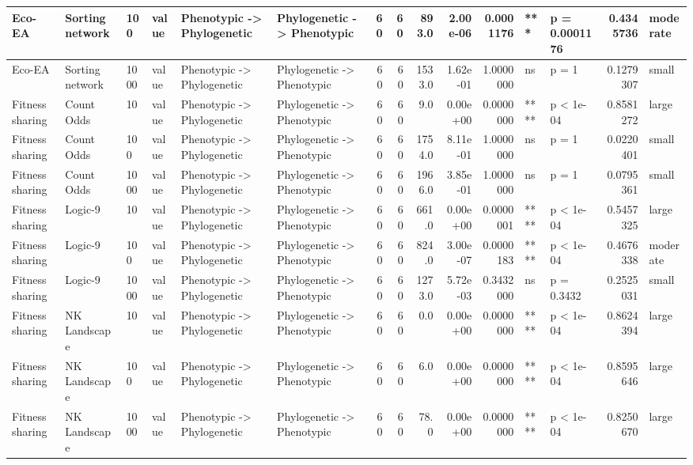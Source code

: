 \documentclass[]{book}
\begin{document}
\begin{table}
\begin{tabular}[t]{l|l|l|l|l|l|r|r|r|r|r|l|l|r|l}
\hline
Eco-EA & Sorting network & 100 & value & Phenotypic
    ->
Phylogenetic & Phylogenetic
    ->
Phenotypic & 60 & 60 & 893.0 & 2.00e-06 & 0.0001176 & *** & p = 0.0001176 & 0.4345736 & moderate\\
\hline
Eco-EA & Sorting network & 1000 & value & Phenotypic
    ->
Phylogenetic & Phylogenetic
    ->
Phenotypic & 60 & 60 & 1533.0 & 1.62e-01 & 1.0000000 & ns & p = 1 & 0.1279307 & small\\
\hline
Fitness sharing & Count Odds & 10 & value & Phenotypic
    ->
Phylogenetic & Phylogenetic
    ->
Phenotypic & 60 & 60 & 9.0 & 0.00e+00 & 0.0000000 & **** & p < 1e-04 & 0.8581272 & large\\
\hline
Fitness sharing & Count Odds & 100 & value & Phenotypic
    ->
Phylogenetic & Phylogenetic
    ->
Phenotypic & 60 & 60 & 1754.0 & 8.11e-01 & 1.0000000 & ns & p = 1 & 0.0220401 & small\\
\hline
Fitness sharing & Count Odds & 1000 & value & Phenotypic
    ->
Phylogenetic & Phylogenetic
    ->
Phenotypic & 60 & 60 & 1966.0 & 3.85e-01 & 1.0000000 & ns & p = 1 & 0.0795361 & small\\
\hline
Fitness sharing & Logic-9 & 10 & value & Phenotypic
    ->
Phylogenetic & Phylogenetic
    ->
Phenotypic & 60 & 60 & 661.0 & 0.00e+00 & 0.0000001 & **** & p < 1e-04 & 0.5457325 & large\\
\hline
Fitness sharing & Logic-9 & 100 & value & Phenotypic
    ->
Phylogenetic & Phylogenetic
    ->
Phenotypic & 60 & 60 & 824.0 & 3.00e-07 & 0.0000183 & **** & p < 1e-04 & 0.4676338 & moderate\\
\hline
Fitness sharing & Logic-9 & 1000 & value & Phenotypic
    ->
Phylogenetic & Phylogenetic
    ->
Phenotypic & 60 & 60 & 1273.0 & 5.72e-03 & 0.3432000 & ns & p = 0.3432 & 0.2525031 & small\\
\hline
Fitness sharing & NK Landscape & 10 & value & Phenotypic
    ->
Phylogenetic & Phylogenetic
    ->
Phenotypic & 60 & 60 & 0.0 & 0.00e+00 & 0.0000000 & **** & p < 1e-04 & 0.8624394 & large\\
\hline
Fitness sharing & NK Landscape & 100 & value & Phenotypic
    ->
Phylogenetic & Phylogenetic
    ->
Phenotypic & 60 & 60 & 6.0 & 0.00e+00 & 0.0000000 & **** & p < 1e-04 & 0.8595646 & large\\
\hline
Fitness sharing & NK Landscape & 1000 & value & Phenotypic
    ->
Phylogenetic & Phylogenetic
    ->
Phenotypic & 60 & 60 & 78.0 & 0.00e+00 & 0.0000000 & **** & p < 1e-04 & 0.8250670 & large\\
\hline

\end{tabular}
\end{table}
\end{document}
